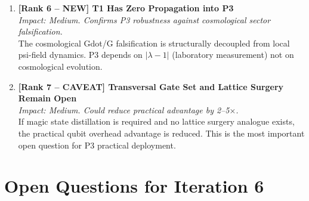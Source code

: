 \documentclass[11pt]{article}
\theoremstyle{definition}
\theoremstyle{remark}
\begin{document}
\begin{enumerate}
\item \textbf{[Rank 6 -- NEW] T1 Has Zero Propagation into P3}\\
  \textit{Impact: Medium.  Confirms P3 robustness against cosmological
  sector falsification.}\\
  The cosmological Gdot/G falsification is structurally decoupled from
  local psi-field dynamics.  P3 depends on $|\lambda-1|$ (laboratory
  measurement) not on cosmological evolution.

\item \textbf{[Rank 7 -- CAVEAT] Transversal Gate Set and Lattice Surgery
  Remain Open}\\
  \textit{Impact: Medium.  Could reduce practical advantage by 2--5$\times$.}\\
  If magic state distillation is required and no lattice surgery analogue
  exists, the practical qubit overhead advantage is reduced.  This is the
  most important open question for P3 practical deployment.

\end{enumerate}

\section{Open Questions for Iteration 6}
\label{sec:open-questions}
\end{document}
